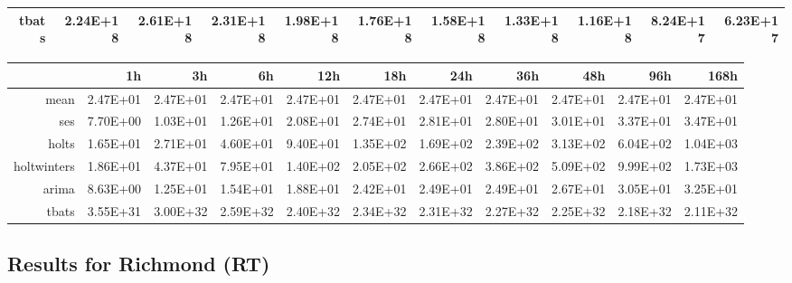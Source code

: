 \begin{landscape}
\begin{table}[ht]
\begin{tabular}{rrrrrrrrrrr}
  tbats & 2.24E+18 & 2.61E+18 & 2.31E+18 & 1.98E+18 & 1.76E+18 & 1.58E+18 & 1.33E+18 & 1.16E+18 & 8.24E+17 & 6.23E+17 \\ 
   \hline
\end{tabular}
\end{table}
\begin{table}[ht]
\centering
\begin{tabular}{rrrrrrrrrrr}
  \hline
 & 1h & 3h & 6h & 12h & 18h & 24h & 36h & 48h & 96h & 168h \\ 
  \hline
mean & 2.47E+01 & 2.47E+01 & 2.47E+01 & 2.47E+01 & 2.47E+01 & 2.47E+01 & 2.47E+01 & 2.47E+01 & 2.47E+01 & 2.47E+01 \\ 
  ses & 7.70E+00 & 1.03E+01 & 1.26E+01 & 2.08E+01 & 2.74E+01 & 2.81E+01 & 2.80E+01 & 3.01E+01 & 3.37E+01 & 3.47E+01 \\ 
  holts & 1.65E+01 & 2.71E+01 & 4.60E+01 & 9.40E+01 & 1.35E+02 & 1.69E+02 & 2.39E+02 & 3.13E+02 & 6.04E+02 & 1.04E+03 \\ 
  holtwinters & 1.86E+01 & 4.37E+01 & 7.95E+01 & 1.40E+02 & 2.05E+02 & 2.66E+02 & 3.86E+02 & 5.09E+02 & 9.99E+02 & 1.73E+03 \\ 
  arima & 8.63E+00 & 1.25E+01 & 1.54E+01 & 1.88E+01 & 2.42E+01 & 2.49E+01 & 2.49E+01 & 2.67E+01 & 3.05E+01 & 3.25E+01 \\ 
  tbats & 3.55E+31 & 3.00E+32 & 2.59E+32 & 2.40E+32 & 2.34E+32 & 2.31E+32 & 2.27E+32 & 2.25E+32 & 2.18E+32 & 2.11E+32 \\ 
   \hline
\end{tabular}
\end{table}

\subsection{Results for Richmond (RT)}


\end{landscape}
